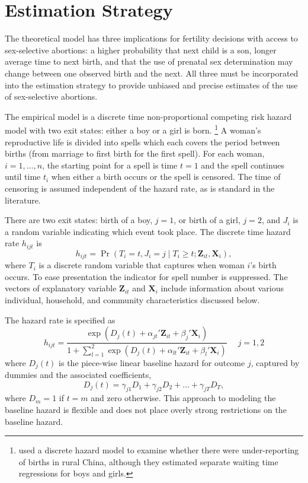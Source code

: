 \documentclass[12pt,letterpaper]{article}
\begin{document}


\section{Estimation Strategy\label{sec:strategy}}

The theoretical model has three implications for fertility decisions with access to 
sex-selective abortions: 
a higher probability that next child is a son, 
longer average time to next birth, 
and that the use of prenatal sex determination may change between one observed 
birth and the next.
All three must be incorporated into the estimation strategy
to provide unbiased and precise estimates of the use of sex-selective abortions.%

The empirical model is a discrete time non-proportional competing risk hazard model with 
two exit states: either a boy or a girl is born.%
\footnote{
\cite{Merli2000} used a discrete hazard model to examine whether 
there were under-reporting of births in rural China, although they 
estimated separate waiting time regressions for boys and girls.
}
A woman's reproductive life is divided into spells which each covers the period between
births (from marriage to first birth for the first spell).
For each woman, $i=1,\ldots,n$, the starting point for a spell is time $t=1$ and 
the spell continues until time $t_i$ when either a birth occurs or the spell is censored.
The time of censoring is assumed independent of the hazard rate,
as is standard in the literature.

There are two exit states: birth of a boy, $j=1$, or birth of a girl, $j=2$, and 
$J_i$ is a random variable indicating which event took place.
The discrete time hazard rate $h_{ijt}$ is
\begin{equation}
 h_{ijt} = \Pr (T_i=t, J_i=j \mid T_i \geq t; \mathbf{Z}_{it},\mathbf{X}_{i} ),
\end{equation}
where $T_i$ is a discrete random variable that captures when woman $i$'s birth occurs.
To ease presentation the indicator for spell number is suppressed.
The vectors of explanatory variable $\mathbf{Z}_{it}$ and $\mathbf{X}_{i}$ include 
information about various individual, household, and community characteristics 
discussed below.

The hazard rate is specified as
\begin{equation}
 h_{ijt} = \frac{\exp(D_j(t) + \alpha_{jt}'\mathbf{Z}_{it} + \beta_j'\mathbf{X}_{i})} 
 {1 + \sum_{l=1}^2 \exp(D_j(t) + \alpha_{lt}'\mathbf{Z}_{it} + \beta_l'\mathbf{X}_{i})} \: \: \; \; \;  j = 1,2
 \label{eq:hazard}
\end{equation}
where $D_{j}(t)$ is the piece-wise linear baseline hazard for outcome $j$, captured
by dummies and the associated coefficients,
\begin{equation}
D_j(t) = \gamma_{j1} D_1 + \gamma_{j2} D_2 + \ldots + \gamma_{jT} D_T,
\end{equation}
where $D_m = 1$ if $t=m$ and zero otherwise.
This approach to modeling the baseline hazard is flexible and does not place overly strong 
restrictions on the baseline hazard.
\end{document}
